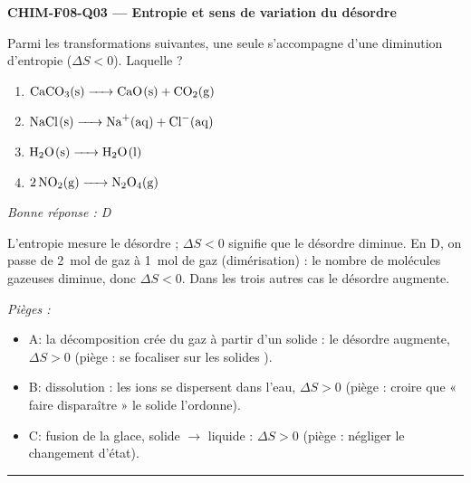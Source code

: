 \documentclass[11pt,a4paper]{article}
\begin{document}
\noindent\textbf{CHIM-F08-Q03 --- Entropie et sens de variation du désordre}\par
Parmi les transformations suivantes, une seule s'accompagne d'une diminution d'entropie ($\Delta S<0$). Laquelle ?
\begin{enumerate}[label=\Alph*)]
\item $\ce{CaCO3(s) -> CaO(s) + CO2(g)}$
\item $\ce{NaCl(s) -> Na+(aq) + Cl-(aq)}$
\item $\ce{H2O(s) -> H2O(l)}$
\item $\ce{2 NO2(g) -> N2O4(g)}$
\end{enumerate}
\textit{Bonne réponse : D}\par
L'entropie mesure le désordre ; $\Delta S<0$ signifie que le désordre diminue. En D, on passe de \qty{2}{\mol} de gaz à \qty{1}{\mol} de gaz (dimérisation) : le nombre de molécules gazeuses diminue, donc $\Delta S<0$. Dans les trois autres cas le désordre augmente.\par
\textit{Pièges :}
\begin{itemize}
\item A: la décomposition crée du gaz  à partir d'un solide : le désordre augmente, $\Delta S>0$ (piège : se focaliser sur les solides ).
\item B: dissolution : les ions se dispersent dans l'eau, $\Delta S>0$ (piège : croire que « faire disparaître » le solide l'ordonne).
\item C: fusion de la glace, solide $\to$ liquide : $\Delta S>0$ (piège : négliger le changement d'état).
\end{itemize}
\vspace{8pt}\hrule\vspace{8pt}
\end{document}
